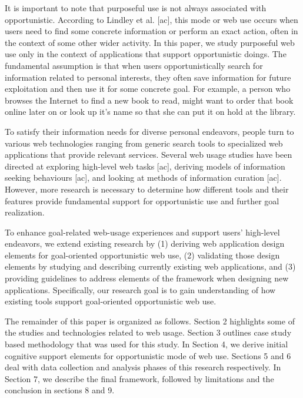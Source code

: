 \documentclass{casconpaper}
\begin{document}
{It is important to note that purposeful use is not always associated with opportunistic. According to Lindley et al. [ac], this mode or web use occurs when users need to find some concrete information or perform an exact action, often in the context of some other wider activity. In this paper, we study purposeful web use only in the context of applications that support opportunistic doings. The fundamental assumption is that when users opportunistically search for information related to personal interests, they often save information for future exploitation and then use it for some concrete goal. For example, a person who browses the Internet to find a new book to read, might want to order that book online later on or look up it’s name so that she can put it on hold at the library. 

To satisfy their information needs for diverse personal endeavors, people turn to various web technologies ranging from generic search tools to specialized web applications that provide relevant services. Several web usage studies have been directed at exploring high-level web tasks [ac], deriving models of information seeking behaviours [ac], and looking at methods of information curation [ac]. However, more research is necessary to determine how different tools and their features provide fundamental support for opportunistic use and further goal realization.

To enhance goal-related web-usage experiences and support users’ high-level endeavors, we extend existing research by (1) deriving web application design elements for goal-oriented opportunistic web use, (2) validating those design elements by studying and describing currently existing web applications, and (3) providing guidelines to address elements of the framework when designing new applications. Specifically, our research goal is to gain understanding of how existing tools support goal-oriented opportunistic web use. 

The remainder of this paper is organized as follows. Section 2 highlights some of the studies and technologies related to web usage. Section 3 outlines case study based methodology that was used for this study. In Section 4, we derive initial cognitive support elements for opportunistic mode of web use.  Sections 5 and 6 deal with data collection and analysis phases of this research respectively. In Section 7, we describe the final framework, followed by limitations and the conclusion in sections 8 and 9.

} %
\end{document}
